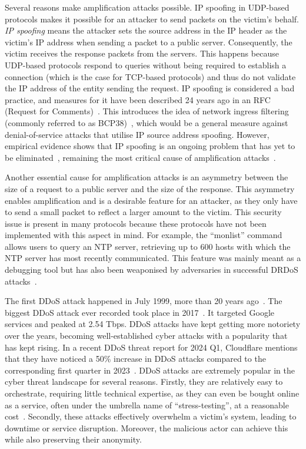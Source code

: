 
 Several reasons make amplification attacks possible. IP spoofing in UDP-based protocols makes it possible for an attacker to send packets on the victim's behalf. \textit{IP spoofing} means the attacker sets the source address in the IP header as the victim's IP address when sending a packet to a public server. Consequently, the victim receives the response packets from the servers. This happens because UDP-based protocols respond to queries without being required to establish a connection (which is the case for TCP-based protocols) and thus do not validate the IP address of the entity sending the request. IP spoofing is considered a bad practice, and measures for it have been described 24 years ago in an RFC (Request for Comments)~\cite{ferguson-2000}. This introduces the idea of network ingress filtering (commonly referred to as BCP38)~\cite{ferguson-2000}, which would be a general measure against denial-of-service attacks that utilise IP source address spoofing.  
However, empirical evidence shows that IP spoofing is an ongoing problem that has yet to be eliminated~\cite{spoofer_project}, remaining the most critical cause of amplification attacks~\cite{amplification_hell}.

 Another essential cause for amplification attacks is an asymmetry between the size of a request to a public server and the size of the response. This asymmetry enables amplification and is a desirable feature for an attacker, as they only have to send a small packet to reflect a larger amount to the victim. This security issue is present in many protocols because these protocols have not been implemented with this aspect in mind. For example, the ``monlist'' command~\cite{cloud_monlist} allows users to query an NTP server, retrieving up to 600 hosts with which the NTP server has most recently communicated. This feature was mainly meant as a debugging tool but has also been weaponised by adversaries in successful DRDoS attacks~\cite{amplification_hell}.

 The first DDoS attack happened in July 1999, more than 20 years ago~\cite{mit_first_ddos}. The biggest DDoS attack ever recorded took place in 2017~\cite{cloud_famoud_ddos}. It targeted Google services and peaked at 2.54 Tbps. DDoS attacks have kept getting more notoriety over the years, becoming well-established cyber attacks with a popularity that has kept rising. In a recent DDoS threat report for 2024 Q1, Cloudflare mentions that they have noticed a 50\% increase in DDoS attacks compared to the corresponding first quarter in 2023~\cite{cloud_q1report}. DDoS attacks are extremely popular in the cyber threat landscape for several reasons. Firstly, they are relatively easy to orchestrate, requiring little technical expertise, as they can even be bought online as a service, often under the umbrella name of ``stress-testing'', at a reasonable cost~\cite{buy_ddos}. Secondly, these attacks effectively overwhelm a victim's system, leading to downtime or service disruption. Moreover, the malicious actor can achieve this while also preserving their anonymity. 

